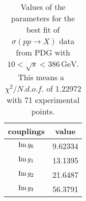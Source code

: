 \documentclass[preprint, 12pt]{elsarticle}
\begin{document}
\begin{table}[b!]
\centering
\caption{Values of the parameters for the best fit of  $\sigma\left(p p \rightarrow X\right)$ data from PDG with $10 < \sqrt{s} < 386 \, \text{GeV}$. This means a~$\chi^2 / {N.d.o.f.}$ of 1.22972 with 71 experimental points.}
\vspace{0.5cm}
\begin{tabular}{|c|c|}
\hline
couplings   & value \\
\hline
${\rm Im} \, g_0$  & 9.62334 \\ 
\hline
${\rm Im} \, g_1$  & 13.1395 \\ 
\hline
${\rm Im} \, g_2$  & 21.6487 \\
\hline
${\rm Im} \, g_3$  & 56.3791 \\ 
\hline
\end{tabular}
\label{table:SigmaProtonProton_best_fit_10_lt_W_lt_386}
\end{table}
\end{document}
